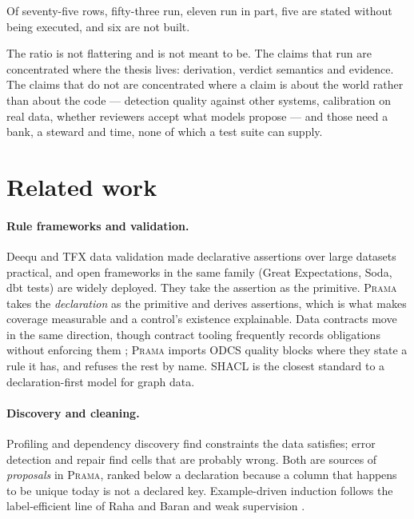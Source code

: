 \documentclass[11pt,a4paper]{article}
\renewcommand{\_}{\oldunderscore\allowbreak}
\theoremstyle{plain}
\theoremstyle{definition}
\theoremstyle{remark}
\begin{document}
Of seventy-five rows, fifty-three run, eleven run in part, five are stated without being executed, and six
are not built.

The ratio is not flattering and is not meant to be. The claims that run are concentrated where the thesis
lives: derivation, verdict semantics and evidence. The claims that do not are concentrated where a claim is
about the world rather than about the code --- detection quality against other systems, calibration on real
data, whether reviewers accept what models propose --- and those need a bank, a steward and time, none of
which a test suite can supply.

\section{Related work}\label{sec:related}

\paragraph{Rule frameworks and validation.} Deequ \cite{deequ} and TFX data validation \cite{tfdv} made
declarative assertions over large datasets practical, and open frameworks in the same family (Great
Expectations, Soda, dbt tests) are widely deployed. They take the assertion as the primitive. \textsc{Prama}
takes the \emph{declaration} as the primitive and derives assertions, which is what makes coverage measurable
and a control's existence explainable. Data contracts \cite{odcs} move in the same direction, though
contract tooling frequently records obligations without enforcing them \cite{contractenforce}; \textsc{Prama}
imports ODCS quality blocks where they state a rule it has, and refuses the rest by name. SHACL
\cite{shacldq,shaclreview} is the closest standard to a declaration-first model for graph data.

\paragraph{Discovery and cleaning.} Profiling and dependency discovery \cite{metanome,fdeval,dcdiscovery,
conformance} find constraints the data satisfies; error detection and repair \cite{holoclean,rahabaran,
zeroed} find cells that are probably wrong. Both are sources of \emph{proposals} in \textsc{Prama}, ranked
below a declaration because a column that happens to be unique today is not a declared key. Example-driven
induction follows the label-efficient line of Raha and Baran \cite{rahabaran} and weak supervision
\cite{snorkel}.
\end{document}
